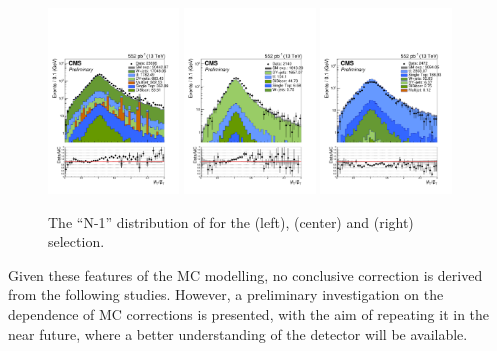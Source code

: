 \begin{figure}[!h]
  \centering
  \includegraphics[width=0.31\textwidth]{figures/sidebandCorr/mhtDivMet_NMinusOne_MHTOverMET_WJets}
  \includegraphics[width=0.31\textwidth]{figures/sidebandCorr/mhtDivMet_NMinusOne_MHTOverMET_DYJetsToLL}
  \includegraphics[width=0.31\textwidth]{figures/sidebandCorr/mhtDivMet_NMinusOne_MHTOverMET_TTJets}
  \caption{The ``N-1'' distribution of \mhtmet for the \wj (left), \zj (center) and \ttj (right) selection.}
  \label{fig:w_z_tt_MHTOverMETsideband}
\end{figure}

Given these features of the MC modelling, no conclusive correction is derived from the following studies. 
However, a preliminary investigation on the \scalht dependence of MC corrections is presented, 
with the aim of repeating it in the near future, where a better understanding of the detector will be available. 

